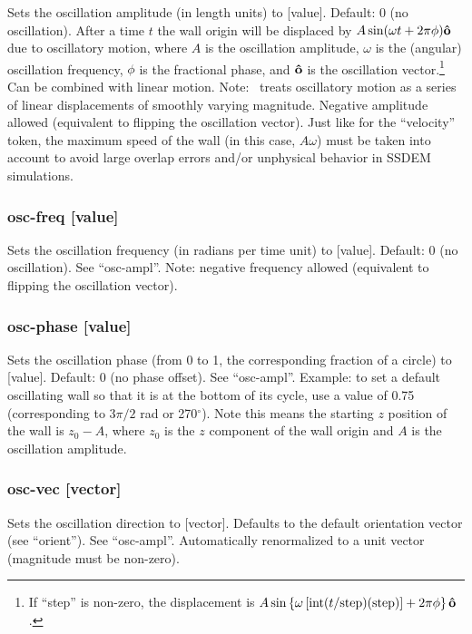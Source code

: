 Sets the oscillation amplitude (in length units) to [value].  Default:
0 (no oscillation).  After a time $t$ the wall origin will be
displaced by $A\sin(\omega t + 2\pi\phi)\mathbf{\hat{o}}$ due to oscillatory
motion, where $A$ is the oscillation amplitude, $\omega$ is the
(angular) oscillation frequency, $\phi$ is the fractional phase, and
$\mathbf{\hat{o}}$ is the oscillation vector.\footnote{If ``step'' is
  non-zero, the displacement is $A\sin\left\{\omega \left[
    \mathrm{int}(t / \mathrm{step}) (\mathrm{step}) \right] + 2\pi\phi
  \right\} \mathbf{\hat{o}}$.} Can be combined with linear motion.  Note:
\pkd\ treats oscillatory motion as a series of linear displacements of
smoothly varying magnitude.  Negative amplitude allowed (equivalent to
flipping the oscillation vector).  Just like for the ``velocity''
token, the maximum speed of the wall (in this case, $A\omega$) must be
taken into account to avoid large overlap errors and/or unphysical
behavior in SSDEM simulations.

\subsubsection{osc-freq [value]}

Sets the oscillation frequency (in radians per time unit) to [value].
Default: 0 (no oscillation).  See ``osc-ampl''.  Note: negative
frequency allowed (equivalent to flipping the oscillation vector).

\subsubsection{osc-phase [value]}

Sets the oscillation phase (from 0 to 1, \ie the corresponding
fraction of a circle) to [value].  Default: 0 (no phase offset).  See
``osc-ampl''.  Example: to set a default oscillating wall so that it is
at the bottom of its cycle, use a value of 0.75 (corresponding to
$3\pi/2$ rad or 270$^\circ$).  Note this means the starting $z$
position of the wall is $z_0 - A$, where $z_0$ is the $z$ component of
the wall origin and $A$ is the oscillation amplitude.

\subsubsection{osc-vec [vector]}

Sets the oscillation direction to [vector].  Defaults to the default
orientation vector (see ``orient'').  See ``osc-ampl''.  Automatically
renormalized to a unit vector (magnitude must be non-zero).

